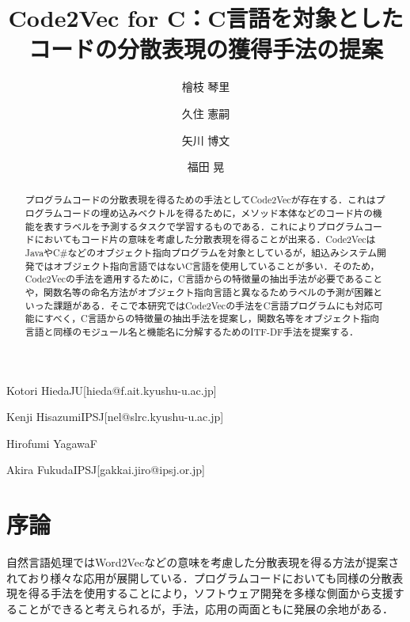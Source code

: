 \documentclass[submit,techrep,noauthor]{ipsj}
\begin{document}
\title{Code2Vec for C：C言語を対象としたコードの分散表現の獲得手法の提案}



\author{檜枝 琴里}{Kotori Hieda}{JU}[hieda@f.ait.kyushu-u.ac.jp]
\author{久住 憲嗣}{Kenji Hisazumi}{IPSJ}[nel@slrc.kyushu-u.ac.jp]
\author{矢川 博文}{Hirofumi Yagawa}{F}
\author{福田 晃}{Akira Fukuda}{IPSJ}[gakkai.jiro@ipsj.or.jp]

\begin{abstract}
プログラムコードの分散表現を得るための手法としてCode2Vecが存在する．これはプログラムコードの埋め込みベクトルを得るために，メソッド本体などのコード片の機能を表すラベルを予測するタスクで学習するものである．これによりプログラムコードにおいてもコード片の意味を考慮した分散表現を得ることが出来る．Code2VecはJavaやC\#などのオブジェクト指向プログラムを対象としているが，組込みシステム開発ではオブジェクト指向言語ではないC言語を使用していることが多い．そのため，Code2Vecの手法を適用するために，C言語からの特徴量の抽出手法が必要であることや，関数名等の命名方法がオブジェクト指向言語と異なるためラベルの予測が困難といった課題がある．そこで本研究ではCode2Vecの手法をC言語プログラムにも対応可能にすべく，C言語からの特徴量の抽出手法を提案し，関数名等をオブジェクト指向言語と同様のモジュール名と機能名に分解するためのITF-DF手法を提案する．
\end{abstract}



\maketitle

\section{序論}
自然言語処理ではWord2Vec\cite{rong2014word2vec}などの意味を考慮した分散表現を得る方法が提案されており様々な応用が展開している．プログラムコードにおいても同様の分散表現を得る手法を使用することにより，ソフトウェア開発を多様な側面から支援することができると考えられるが，手法，応用の両面ともに発展の余地がある．
\end{document}
